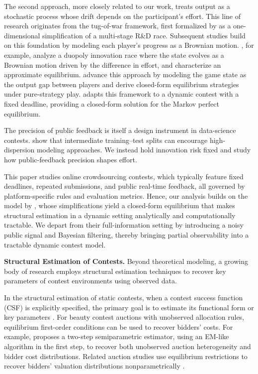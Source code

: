 \documentclass[mnsc]{informs3}
\begin{document}
The second approach, more closely related to our work, treats output as a stochastic process whose drift depends on the participant’s effort.
This line of research originates from the tug-of-war framework, first formalized by \citet{Harris1987Race} as a one-dimensional simplification of a multi-stage R\&D race.
Subsequent studies build on this foundation by modeling each player’s progress as a Brownian motion.
\citet{budd1993Duopoly}, for example, analyze a duopoly innovation race where the state evolves as a Brownian motion driven by the difference in effort, and characterize an approximate equilibrium.
\citet{Moscarini2007Contest} advance this approach by modeling the game state as the output gap between players and derive closed-form equilibrium strategies under pure-strategy play.
\citet{Ryvkin2022Fight} adapts this framework to a dynamic contest with a fixed deadline, providing a closed-form solution for the Markov perfect equilibrium.

The precision of public feedback is itself a design instrument in data-science contests.
\citet{huang_2024_designing} show that intermediate training–test splits can encourage high-dispersion modeling approaches.
We instead hold innovation risk fixed and study how public-feedback precision shapes effort.


This paper studies online crowdsourcing contests, which typically feature fixed deadlines, repeated submissions, and public real-time feedback, all governed by platform-specific rules and evaluation metrics.
Hence, our analysis builds on the model by \citet{Ryvkin2022Fight}, whose simplifications yield a closed-form equilibrium that makes structural estimation in a dynamic setting analytically and computationally tractable.
We depart from their full-information setting by introducing a noisy public signal and Bayesian filtering, thereby bringing partial observability into a tractable dynamic contest model.



\textbf{Structural Estimation of Contests.}
Beyond theoretical modeling, a growing body of research employs structural estimation techniques to recover key parameters of contest environments using observed data.

In the structural estimation of static contests, when a contest success function (CSF) is explicitly specified, the primary goal is to estimate its functional form or key parameters \citep{hwang2012technology, kang2016policy, huang2021structural}.
For beauty contest auctions with unobserved allocation rules, equilibrium first-order conditions can be used to recover bidders' costs.
For example, \citet{yoganarasimhan2016estimation} proposes a two-step semiparametric estimator, using an EM-like algorithm in the first step, to recover both unobserved auction heterogeneity and bidder cost distributions.
Related auction studies use equilibrium restrictions to recover bidders' valuation distributions nonparametrically \citep{guerre2000optimal, shakhgildyan2022nonparametric}.
\end{document}
